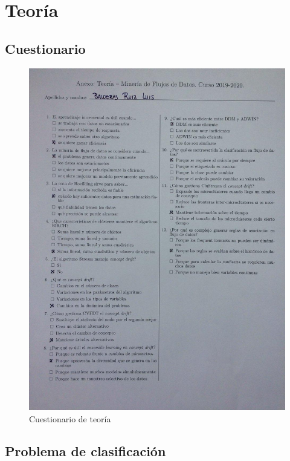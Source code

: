 \section{Teoría}

\subsection{Cuestionario}
\begin{figure}[H] %
	\centering
	\includegraphics[scale=0.65]{cuestionario.jpg}  %
	\caption{Cuestionario de teoría} 
	\label{cuestionario}
\end{figure}
\subsection{Problema de clasificación}

